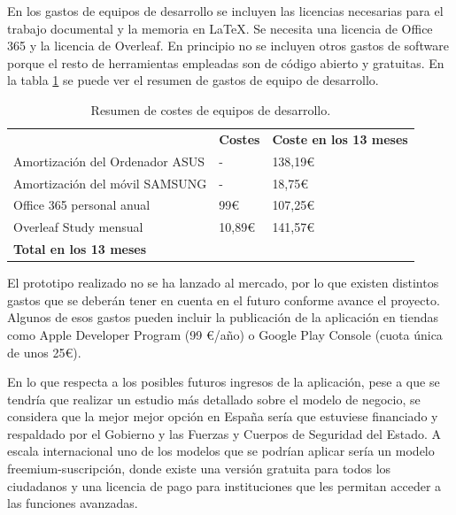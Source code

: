     En los gastos de equipos de desarrollo se incluyen las licencias necesarias para el trabajo documental y la memoria en LaTeX. Se necesita una licencia de Office 365 y la licencia de Overleaf. En principio no se incluyen otros gastos de software porque el resto de herramientas empleadas son de código abierto y gratuitas. En la tabla \ref{CostesDesarrollo} se puede ver el resumen de gastos de equipo de desarrollo.

    \begin{table}[h!]
    \centering
    \begin{tabular}{ |m{6cm} m{3cm} m{3cm}|  } 
    \hline
    \cellcolor[HTML]{EFEFEF}\textbf{} & \cellcolor[HTML]{EFEFEF}\textbf{Costes}& \cellcolor[HTML]{EFEFEF}\textbf{Coste en los 13 meses}\\
    
    Amortización del Ordenador ASUS           & {-} & {138,19\euro }\\

    Amortización del móvil SAMSUNG           & {-} & {18,75\euro }\\
    
    Office 365 personal anual              & {99\euro } & {107,25\euro }\\

    Overleaf Study mensual              & {10,89\euro } & {141,57\euro }\\
    \hline
    \cellcolor[HTML]{EFEFEF}\textbf{Total en los 13 meses}                & \cellcolor[HTML]{EFEFEF}{-} & \cellcolor[HTML]{EFEFEF}{405,76\euro } \\
    \hline
    \end{tabular}
    \caption{Resumen de costes de equipos de desarrollo.}
    \label{CostesDesarrollo}
    \end{table}
    
    El prototipo realizado no se ha lanzado al mercado, por lo que existen distintos gastos que se deberán tener en cuenta en el futuro conforme avance el proyecto. Algunos de esos gastos pueden incluir la publicación de la aplicación en tiendas como Apple Developer Program (99 \euro/año) o Google Play Console (cuota única de unos 25\euro).

    En lo que respecta a los posibles futuros ingresos de la aplicación, pese a que se tendría que realizar un estudio más detallado sobre el modelo de negocio, se considera que la mejor mejor opción en España sería que estuviese financiado y respaldado por el Gobierno y las Fuerzas y Cuerpos de Seguridad del Estado. A escala internacional uno de los modelos que se podrían aplicar sería un modelo freemium-suscripción, donde existe una versión gratuita para todos los ciudadanos y una licencia de pago para instituciones que les permitan acceder a las funciones avanzadas.

